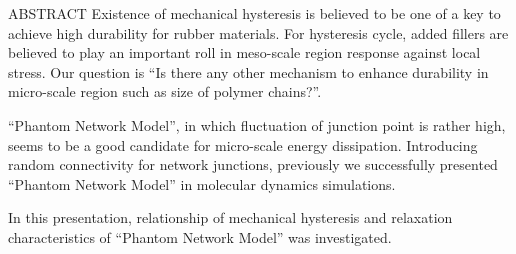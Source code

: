 \begin{itembox}[l]{ABSTRACT}
	Existence of mechanical hysteresis is believed to be one of a key to achieve high durability for rubber materials.
	For hysteresis cycle, added fillers are believed to play an important roll in meso-scale region response against local stress.
	Our question is ``Is there any other mechanism to enhance durability in micro-scale region such as size of polymer chains?''.

	``Phantom Network Model'', in which fluctuation of junction point is rather high, seems to be a good candidate for micro-scale energy dissipation.
	Introducing random connectivity for network junctions, previously we successfully presented ``Phantom Network Model'' in molecular dynamics simulations.

	In this presentation, relationship of mechanical hysteresis and relaxation characteristics of ``Phantom Network Model'' was investigated.
\end{itembox}